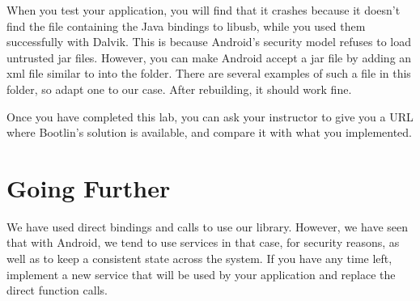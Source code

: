When you test your application, you will find that it
crashes because it doesn't find the  file containing the Java
bindings to libusb, while you used them successfully with
Dalvik. This is because Android's security model refuses to load
untrusted jar files. However, you can make Android accept a jar file
by adding an xml file similar to  into
the  folder. There are several examples
of such a file in this folder, so adapt one to our case. After
rebuilding, it should work fine.

Once you have completed this lab, you can ask your instructor to
give you a URL where Bootlin's solution is available, and compare
it with what you implemented.

\section{Going Further}

We have used direct bindings and calls to use our library. However, we
have seen that with Android, we tend to use services in that case, for
security reasons, as well as to keep a consistent state across the
system. If you have any time left, implement a new service that will
be used by your application and replace the direct function calls.
